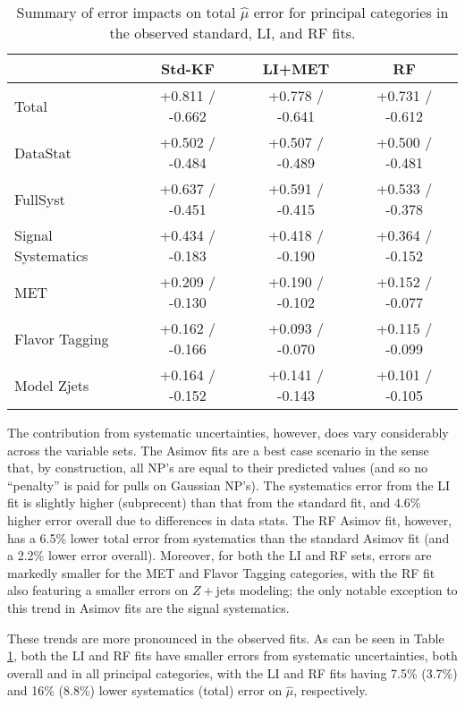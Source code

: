 \begin{table}[!htbp]
\begin{center}
\begin{tabular}{lccc}
\hline\hline
 &Std-KF &LI+MET &RF\\
\hline
Total &  +0.811 / -0.662  &  +0.778 / -0.641  &  +0.731 / -0.612 \\
\hline
DataStat &  +0.502 / -0.484  &  +0.507 / -0.489  &  +0.500 / -0.481 \\
\hline
FullSyst &  +0.637 / -0.451  &  +0.591 / -0.415  &  +0.533 / -0.378 \\
\hline
Signal Systematics &  +0.434 / -0.183  &  +0.418 / -0.190  &  +0.364 / -0.152 \\
\hline
MET &  +0.209 / -0.130  &  +0.190 / -0.102  &  +0.152 / -0.077 \\
\hline
Flavor Tagging &  +0.162 / -0.166  &  +0.093 / -0.070  &  +0.115 / -0.099 \\
\hline
Model Zjets &  +0.164 / -0.152  &  +0.141 / -0.143  &  +0.101 / -0.105 \\
\hline
\end{tabular}
\caption{Summary of error impacts on total $\hat{\mu}$ error for principal categories in the observed standard, LI, and RF fits.}
\label{tab:bd-obs-summary}
\end{center}
\end{table}


The contribution from systematic uncertainties, however, does vary considerably across the variable sets.  The Asimov fits are a best case scenario in the sense that, by construction, all NP's are equal to their predicted values (and so no ``penalty'' is paid for pulls on Gaussian NP's).  The systematics error from the LI fit is slightly higher (subprecent) than that from the standard fit, and 4.6\% higher error overall due to differences in data stats.  The RF Asimov fit, however, has a 6.5\% lower total error from systematics than the standard Asimov fit (and a 2.2\% lower error overall).  Moreover, for both the LI and RF sets, errors are markedly smaller for the MET and Flavor Tagging categories, with the RF fit also featuring a smaller errors on $Z+$jets modeling; the only notable exception to this trend in Asimov fits are the signal systematics.

These trends are more pronounced in the observed fits.  As can be seen in Table \ref{tab:bd-obs-summary}, both the LI and RF fits have smaller errors from systematic uncertainties, both overall and in all principal categories, with the LI and RF fits having 7.5\% (3.7\%) and 16\% (8.8\%) lower systematics (total) error on $\hat{\mu}$, respectively.

